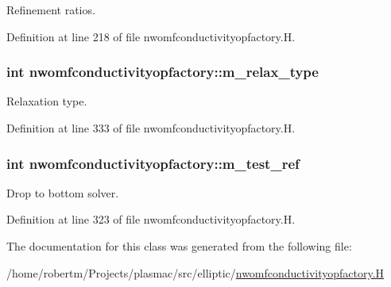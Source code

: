 Refinement ratios. 



Definition at line 218 of file nwomfconductivityopfactory.\+H.

\subsubsection[{\texorpdfstring{m\+\_\+relax\+\_\+type}{m_relax_type}}]{\setlength{\rightskip}{0pt plus 5cm}int nwomfconductivityopfactory\+::m\+\_\+relax\+\_\+type\hspace{0.3cm}{\ttfamily [protected]}}\hypertarget{classnwomfconductivityopfactory_a6253bfc07cdb0cbf628dc8deed1c7a7f}{}\label{classnwomfconductivityopfactory_a6253bfc07cdb0cbf628dc8deed1c7a7f}


Relaxation type. 



Definition at line 333 of file nwomfconductivityopfactory.\+H.

\subsubsection[{\texorpdfstring{m\+\_\+test\+\_\+ref}{m_test_ref}}]{\setlength{\rightskip}{0pt plus 5cm}int nwomfconductivityopfactory\+::m\+\_\+test\+\_\+ref\hspace{0.3cm}{\ttfamily [protected]}}\hypertarget{classnwomfconductivityopfactory_a5f774e71547459513f2571984544b9cc}{}\label{classnwomfconductivityopfactory_a5f774e71547459513f2571984544b9cc}


Drop to bottom solver. 



Definition at line 323 of file nwomfconductivityopfactory.\+H.



The documentation for this class was generated from the following file\+:\begin{DoxyCompactItemize}
\item 
/home/robertm/\+Projects/plasmac/src/elliptic/\hyperlink{nwomfconductivityopfactory_8H}{nwomfconductivityopfactory.\+H}\end{DoxyCompactItemize}
